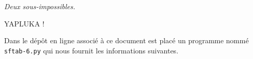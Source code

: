 \begin{center}
	
	\smallskip
	
	\emph{\small Deux sous-\sftab[x] impossibles.}
\end{center}


{\Huge YAPLUKA !}

Dans le dépôt en ligne associé à ce document est placé un programme nommé \verb#sftab-6.py# qui nous fournit les informations suivantes.
